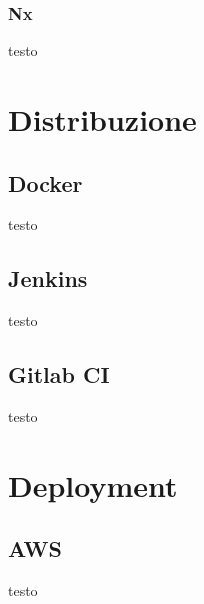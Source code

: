 \subsubsection{Nx}
testo

\section{Distribuzione}
\subsection{Docker}
testo
\subsection{Jenkins}
testo
\subsection{Gitlab CI}
testo

\section{Deployment}
\subsection{AWS}
testo
